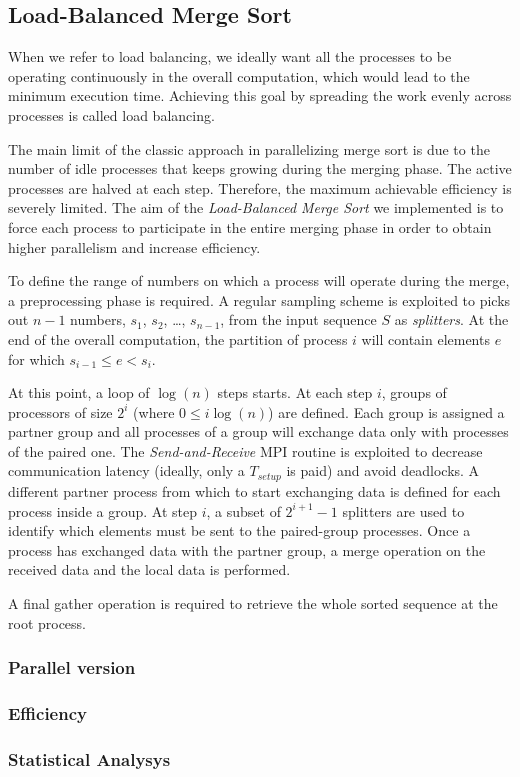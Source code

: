 \subsection{Load-Balanced Merge Sort}
When we refer to load balancing, we ideally want all the processes to be operating continuously in the overall computation, which would lead to the minimum execution time. Achieving this goal by spreading the work evenly across processes is called load balancing.

The main limit of the classic approach in parallelizing merge sort is due to the number of idle processes that keeps growing during the merging phase. The active processes are halved at each step. Therefore, the maximum achievable efficiency is severely limited. The aim of the \textit{Load-Balanced Merge Sort} we implemented is to force each process to participate in the entire merging phase in order to obtain higher parallelism and increase efficiency.

To define the range of numbers on which a process will operate during the merge, a preprocessing phase is required. A regular sampling scheme is exploited to picks out $n-1$ numbers, $s_1$, $s_2$, \dots, $s_{n-1}$, from the input sequence $S$ as \textit{splitters}. At the end of the overall computation, the partition of process $i$ will contain elements $e$ for which $s_{i-1} \leq e < s_i$.

At this point, a loop of $\log (n)$ steps starts. At each step $i$, groups of processors of size $2^i$ (where $0 \leq i \log(n)$) are defined. Each group is assigned a partner group and all processes of a group will exchange data only with processes of the paired one. The \textit{Send-and-Receive} MPI routine is exploited to decrease communication latency (ideally, only a $T_{setup}$ is paid) and avoid deadlocks. A different partner process from which to start exchanging data is defined for each process inside a group. At step $i$, a subset of $2^{i+1}-1$ splitters are used to identify which elements must be sent to the paired-group processes. Once a process has exchanged data with the partner group, a merge operation on the received data and the local data is performed.

A final gather operation is required to retrieve the whole sorted sequence at the root process.



\subsubsection*{Parallel version}
\subsubsection*{Efficiency} 
\subsubsection*{Statistical Analysys}
